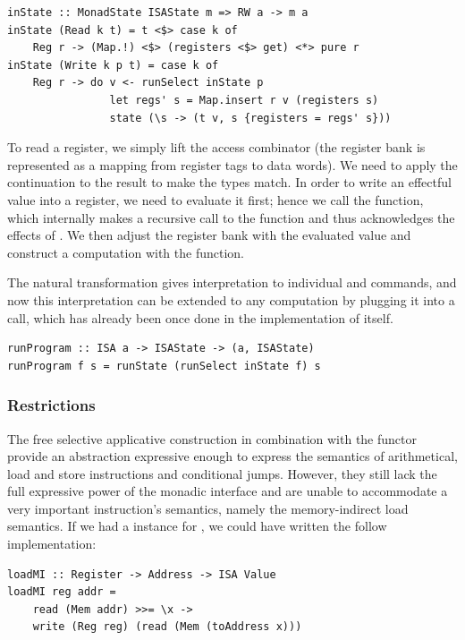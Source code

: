 \begin{verbatim}
inState :: MonadState ISAState m => RW a -> m a
inState (Read k t) = t <$> case k of
    Reg r -> (Map.!) <$> (registers <$> get) <*> pure r
inState (Write k p t) = case k of
    Reg r -> do v <- runSelect inState p
                let regs' s = Map.insert r v (registers s)
                state (\s -> (t v, s {registers = regs' s}))
\end{verbatim}

To read a register, we simply lift the  access combinator (the register bank
is represented as a mapping from register tags to data words). We need to apply the
continuation  to the result to make the types match. In order to write
an effectful value  into a register, we need to evaluate it first; hence we call the
 function, which internally makes a recursive call to the  function
and thus acknowledges the effects of . We then adjust the register bank with the evaluated
value and construct a  computation with the  function.

The  natural transformation gives interpretation to individual  and
 commands, and now this interpretation can be extended to any 
computation by plugging it into a  call, which has already been once done in
the implementation of  itself.

\begin{verbatim}
runProgram :: ISA a -> ISAState -> (a, ISAState)
runProgram f s = runState (runSelect inState f) s
\end{verbatim}

\subsubsection{\textbf{Restrictions}}

The free selective applicative construction in combination with the  functor
provide an abstraction expressive enough to express the
semantics of arithmetical, load and store instructions and conditional jumps. However,
they still lack the full expressive power of the monadic interface and are unable
to accommodate a very important instruction's semantics, namely the memory-indirect
load semantics. If we had a  instance for , we could have written
the follow implementation:

\begin{verbatim}
loadMI :: Register -> Address -> ISA Value
loadMI reg addr =
    read (Mem addr) >>= \x ->
    write (Reg reg) (read (Mem (toAddress x)))
\end{verbatim}


